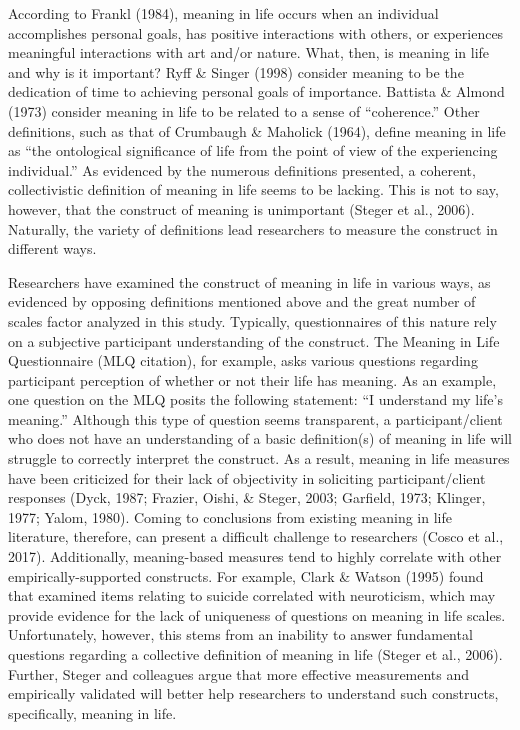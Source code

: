 \documentclass[man,draftall]{apa6}
\begin{document}
According to Frankl (1984), meaning in life occurs when an individual accomplishes personal goals, has positive interactions with others, or experiences meaningful interactions with art and/or nature. What, then, is meaning in life and why is it important? Ryff \& Singer (1998) consider meaning to be the dedication of time to achieving personal goals of importance. Battista \& Almond (1973) consider meaning in life to be related to a sense of \enquote{coherence.} Other definitions, such as that of Crumbaugh \& Maholick (1964), define meaning in life as \enquote{the ontological significance of life from the point of view of the experiencing individual.} As evidenced by the numerous definitions presented, a coherent, collectivistic definition of meaning in life seems to be lacking. This is not to say, however, that the construct of meaning is unimportant (Steger et al., 2006). Naturally, the variety of definitions lead researchers to measure the construct in different ways.

Researchers have examined the construct of meaning in life in various ways, as evidenced by opposing definitions mentioned above and the great number of scales factor analyzed in this study. Typically, questionnaires of this nature rely on a subjective participant understanding of the construct. The Meaning in Life Questionnaire (MLQ citation), for example, asks various questions regarding participant perception of whether or not their life has meaning. As an example, one question on the MLQ posits the following statement: \enquote{I understand my life's meaning.} Although this type of question seems transparent, a participant/client who does not have an understanding of a basic definition(s) of meaning in life will struggle to correctly interpret the construct. As a result, meaning in life measures have been criticized for their lack of objectivity in soliciting participant/client responses (Dyck, 1987; Frazier, Oishi, \& Steger, 2003; Garfield, 1973; Klinger, 1977; Yalom, 1980). Coming to conclusions from existing meaning in life literature, therefore, can present a difficult challenge to researchers (Cosco et al., 2017). Additionally, meaning-based measures tend to highly correlate with other empirically-supported constructs. For example, Clark \& Watson (1995) found that examined items relating to suicide correlated with neuroticism, which may provide evidence for the lack of uniqueness of questions on meaning in life scales. Unfortunately, however, this stems from an inability to answer fundamental questions regarding a collective definition of meaning in life (Steger et al., 2006). Further, Steger and colleagues argue that more effective measurements and empirically validated will better help researchers to understand such constructs, specifically, meaning in life.
\end{document}
